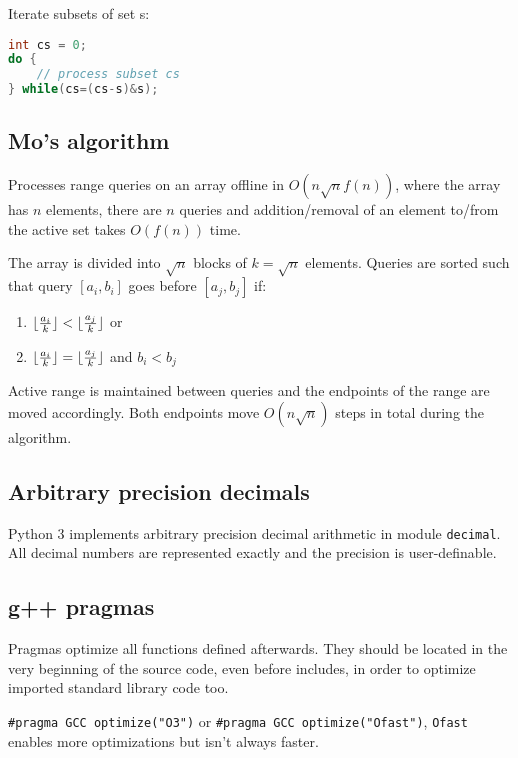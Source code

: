 \documentclass{article}
\DeclarePairedDelimiter\floor{\lfloor}{\rfloor} %
\begin{document}
Iterate subsets of set s:
\begin{lstlisting}[language=C++]
int cs = 0;
do {
	// process subset cs
} while(cs=(cs-s)&s);
\end{lstlisting}

\subsection{Mo's algorithm}

Processes range queries on an array offline in $O(n\sqrt{n}f(n))$, where the array has $n$ elements, there are $n$ queries and addition/removal of an element to/from the active set takes $O(f(n))$ time.

The array is divided into $\sqrt{n}$ blocks of $k = \sqrt{n}$ elements. Queries are sorted such that query $[a_i, b_i]$ goes before $[a_j, b_j]$ if:

\begin{enumerate}
	\item $\floor{\frac{a_i}{k}} < \floor{\frac{a_j}{k}}$ or
	\item $\floor{\frac{a_i}{k}} = \floor{\frac{a_j}{k}}$ and $b_i < b_j$
\end{enumerate}

Active range is maintained between queries and the endpoints of the range are moved accordingly. Both endpoints move $O(n\sqrt{n})$ steps in total during the algorithm.

\subsection {Arbitrary precision decimals}

Python 3 implements arbitrary precision decimal arithmetic in module \texttt{decimal}. All decimal numbers are represented exactly and the precision is user-definable.



\subsection {g++ pragmas}

Pragmas optimize all functions defined afterwards. They should be located in the very beginning of the source code, even before includes, in order to optimize imported standard library code too.

\texttt{\#pragma GCC optimize("O3")} or \texttt{\#pragma GCC optimize("Ofast")}, \texttt{Ofast} enables more optimizations but isn't always faster.
\end{document}
